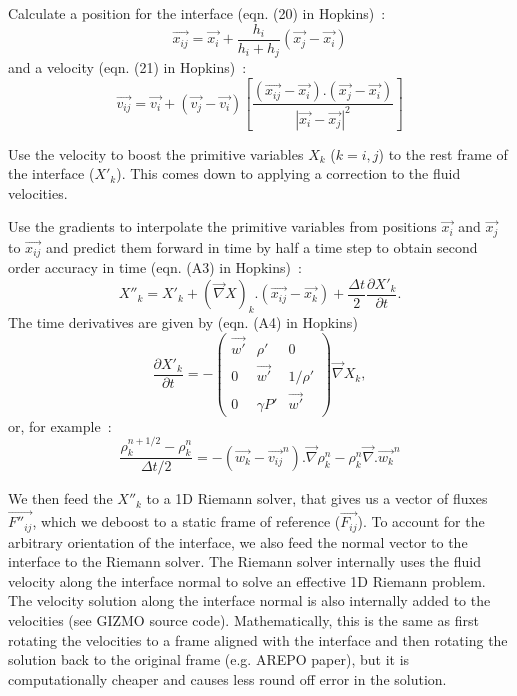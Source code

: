 Calculate a position for the interface (eqn. (20) in Hopkins)~:
\begin{equation}
	\vec{x_{ij}} = \vec{x_i} + \frac{h_i}{h_i+h_j} (\vec{x_j} - \vec{x_i})
\end{equation}
and a velocity (eqn. (21) in Hopkins)~:
\begin{equation}
	\vec{v_{ij}} = \vec{v_i} + (\vec{v_j}-\vec{v_i})\left[ \frac{(\vec{x_{ij}}-\vec{x_i}).(\vec{x_j}-\vec{x_i})}{|\vec{x_i}-\vec{x_j}|^2} \right]
\end{equation}

Use the velocity to boost the primitive variables $X_k$ ($k=i,j$) to the rest frame of the interface ($X'_k$). This comes down to applying a correction to the fluid velocities.

Use the gradients to interpolate the primitive variables from positions $\vec{x_i}$ and $\vec{x_j}$ to $\vec{x_{ij}}$ and predict them forward in time
by half a time step to obtain second order accuracy in time (eqn. (A3) in Hopkins)~:
\begin{equation}
	X''_k = X'_k + \left(\vec{\nabla}X\right)_k.(\vec{x_{ij}}-\vec{x_k}) + \frac{\Delta t}{2} \frac{\partial X'_k}{\partial t}.
\end{equation}
The time derivatives are given by (eqn. (A4) in Hopkins)
\begin{equation}
	\frac{\partial X'_k}{\partial t} = -\begin{pmatrix}
	\vec{w'} & \rho' & 0\\
	0 & \vec{w'} & 1/\rho'\\
	0 & \gamma P' & \vec{w'}
	\end{pmatrix} \vec{\nabla}X_k,
\end{equation}
or, for example~:
\begin{equation}
	\frac{\rho_k^{n+1/2}-\rho_k^n}{\Delta t/2} = -\left( \vec{w_k}-\vec{v_{ij}}^n \right).\vec{\nabla}\rho_k^n - \rho_k^n \vec{\nabla}.\vec{w_k}^n
\end{equation}

We then feed the $X''_k$ to a 1D Riemann solver, that gives us a vector of fluxes $\vec{F''_{ij}}$, which we deboost to a static frame of reference ($\vec{F_{ij}}$). To account for the arbitrary orientation of the interface, we also feed the normal vector to the interface to the Riemann solver. The Riemann solver internally uses the fluid velocity along the interface normal to solve an effective 1D Riemann problem. The velocity solution along the interface normal is also internally added to the velocities (see GIZMO source code). Mathematically, this is the same as first rotating the velocities to a frame aligned with the interface and then rotating the solution back to the original frame (e.g. AREPO paper), but it is computationally cheaper and causes less round off error in the solution.

